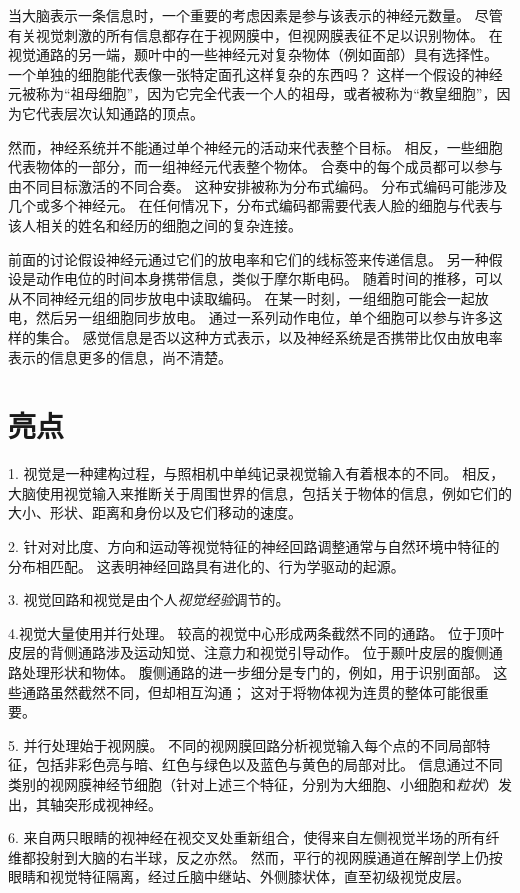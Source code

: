 当大脑表示一条信息时，一个重要的考虑因素是参与该表示的神经元数量。
尽管有关视觉刺激的所有信息都存在于视网膜中，但视网膜表征不足以识别物体。
在视觉通路的另一端，颞叶中的一些神经元对复杂物体（例如面部）具有选择性。
一个单独的细胞能代表像一张特定面孔这样复杂的东西吗？
这样一个假设的神经元被称为“祖母细胞”，因为它完全代表一个人的祖母，或者被称为“教皇细胞”，因为它代表层次认知通路的顶点。


然而，神经系统并不能通过单个神经元的活动来代表整个目标。
相反，一些细胞代表物体的一部分，而一组神经元代表整个物体。
合奏中的每个成员都可以参与由不同目标激活的不同合奏。
这种安排被称为分布式编码。
分布式编码可能涉及几个或多个神经元。
在任何情况下，分布式编码都需要代表人脸的细胞与代表与该人相关的姓名和经历的细胞之间的复杂连接。


前面的讨论假设神经元通过它们的放电率和它们的线标签来传递信息。
另一种假设是动作电位的时间本身携带信息，类似于摩尔斯电码。
随着时间的推移，可以从不同神经元组的同步放电中读取编码。
在某一时刻，一组细胞可能会一起放电，然后另一组细胞同步放电。
通过一系列动作电位，单个细胞可以参与许多这样的集合。
感觉信息是否以这种方式表示，以及神经系统是否携带比仅由放电率表示的信息更多的信息，尚不清楚。



\section{亮点}

1. 视觉是一种建构过程，与照相机中单纯记录视觉输入有着根本的不同。
相反，大脑使用视觉输入来推断关于周围世界的信息，包括关于物体的信息，例如它们的大小、形状、距离和身份以及它们移动的速度。


2. 针对对比度、方向和运动等视觉特征的神经回路调整通常与自然环境中特征的分布相匹配。
这表明神经回路具有进化的、行为学驱动的起源。


3. 视觉回路和视觉是由个人\textit{视觉经验}调节的。


4.视觉大量使用并行处理。
较高的视觉中心形成两条截然不同的通路。
位于顶叶皮层的背侧通路涉及运动知觉、注意力和视觉引导动作。
位于颞叶皮层的腹侧通路处理形状和物体。
腹侧通路的进一步细分是专门的，例如，用于识别面部。 
这些通路虽然截然不同，但却相互沟通；
这对于将物体视为连贯的整体可能很重要。
 

5. 并行处理始于视网膜。
不同的视网膜回路分析视觉输入每个点的不同局部特征，包括非彩色亮与暗、红色与绿色以及蓝色与黄色的局部对比。
信息通过不同类别的视网膜神经节细胞（针对上述三个特征，分别为大细胞、小细胞和\textit{粒状}）发出，其轴突形成视神经。
 

6. 来自两只眼睛的视神经在视交叉处重新组合，使得来自左侧视觉半场的所有纤维都投射到大脑的右半球，反之亦然。
然而，平行的视网膜通道在解剖学上仍按眼睛和视觉特征隔离，经过丘脑中继站、外侧膝状体，直至初级视觉皮层。 


